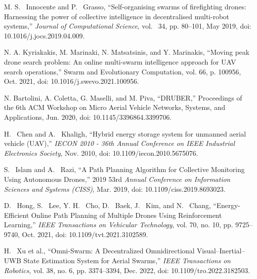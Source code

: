 \documentclass[conference]{IEEEtran}
\begin{document}
\begin{thebibliography}{1}
M. S. ~Innocente and P. ~Grasso, “Self-organising swarms of firefighting drones: Harnessing the power of collective intelligence in decentralised multi-robot systems,” \emph{Journal of Computational Science}, vol. ~34, pp. 80–101, May 2019, doi: 10.1016/j.jocs.2019.04.009.

N. A. Kyriakakis, M. Marinaki, N. Matsatsinis, and Y. Marinakis, “Moving peak drone search problem: An online multi-swarm intelligence approach for UAV search operations,” Swarm and Evolutionary Computation, vol. 66, p. 100956, Oct. 2021, doi: 10.1016/j.swevo.2021.100956.

N. Bartolini, A. Coletta, G. Maselli, and M. Piva, “DRUBER,” Proceedings of the 6th ACM Workshop on Micro Aerial Vehicle Networks, Systems, and Applications, Jun. 2020, doi: 10.1145/3396864.3399706.

H. ~Chen and A. ~Khaligh, “Hybrid energy storage system for unmanned aerial vehicle (UAV),” \emph{IECON 2010 - 36th Annual Conference on IEEE Industrial Electronics Society}, Nov. 2010, doi: 10.1109/iecon.2010.5675076.

S. ~Islam and A. ~Razi, “A Path Planning Algorithm for Collective Monitoring Using Autonomous Drones,” 2019 53rd \emph{Annual Conference on Information Sciences and Systems (CISS)}, Mar. 2019, doi: 10.1109/ciss.2019.8693023.

D. ~Hong, S. ~Lee, Y. H. ~Cho, D. ~Baek, J. ~Kim, and N. ~Chang, “Energy-Efficient Online Path Planning of Multiple Drones Using Reinforcement Learning,” \emph{IEEE Transactions on Vehicular Technology}, vol. 70, no. 10, pp. 9725–9740, Oct. 2021, doi: 10.1109/tvt.2021.3102589.

H. ~Xu et al., “Omni-Swarm: A Decentralized Omnidirectional Visual–Inertial–UWB State Estimation System for Aerial Swarms,” \emph{IEEE Transactions on Robotics}, vol. 38, no. 6, pp. 3374–3394, Dec. 2022, doi: 10.1109/tro.2022.3182503.


\end{thebibliography}
\end{document}

